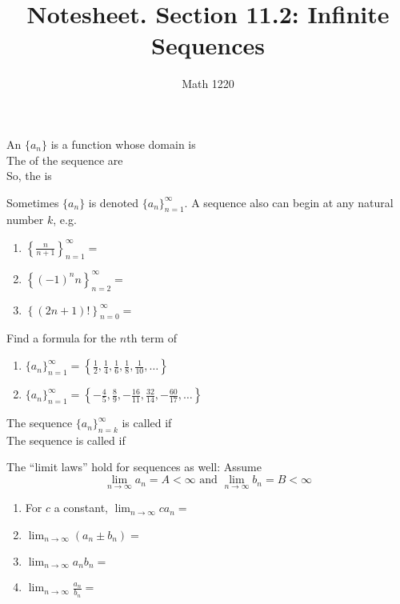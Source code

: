 \documentclass[12pt, a4paper]{article}
\author{Math 1220}
\title{Notesheet. Section 11.2: Infinite Sequences}
\date{}
\begin{document}
\maketitle
\nameline
\begin{defi}
  An  \(\{a_n\}\) is a function whose domain is
  \\

  The  of the sequence are\\
  
  So, the  is 
\end{defi}
\begin{rmk}
  Sometimes \(\{a_n\}\) is denoted \(\{a_n\}_{n=1}^\infty\). A
  sequence also can begin at any natural number \(k\), e.g.
  \begin{enumerate}
  \item \(\left\{ \frac{n}{n+1} \right\}_{n=1}^\infty = \)
  \item \(\left\{ (-1)^n n \right\}_{n=2}^\infty =\)
  \item \(\left\{ (2n+1)! \right\}_{n=0}^\infty =\)
  \end{enumerate}
\end{rmk}
\begin{ex}
  Find a formula for the \(n\)th term of
  \begin{enumerate}
  \item \(\{a_n\}_{n=1}^\infty = \left\{\frac{1}{2}, \frac{1}{4},
      \frac{1}{6}, \frac{1}{8}, \frac{1}{10}, \ldots \right\}\)
  \item \(\{a_n\}_{n=1}^\infty = \left\{ -\frac{4}{5}, \frac{8}{9},
      -\frac{16}{11}, \frac{32}{14}, -\frac{60}{17}, \ldots\right\}\)
  \end{enumerate}
\end{ex}
\vspace{-0.5in}
\begin{defi}
  The sequence \(\{a_n\}_{n=k}^\infty\) is called  if
  \\

  The sequence is called  if 
\end{defi}
\begin{thrm}
  The ``limit laws''  hold for sequences as well: Assume \[
    \lim_{n \to \infty} a_n = A < \infty \text{ and } \lim_{n \to
      \infty} b_n = B < \infty
  \]
  \begin{enumerate}
  \item For \(c\) a constant, \(\lim_{n \to \infty} ca_n = \)
  \item \(\lim_{n \to \infty} (a_n \pm b_n) = \)
  \item \(\lim_{n \to \infty} a_n b_n = \)
  \item \(\lim_{n \to \infty} \frac{a_n}{b_n} = \)
  \end{enumerate}
\end{thrm}
\end{document}
